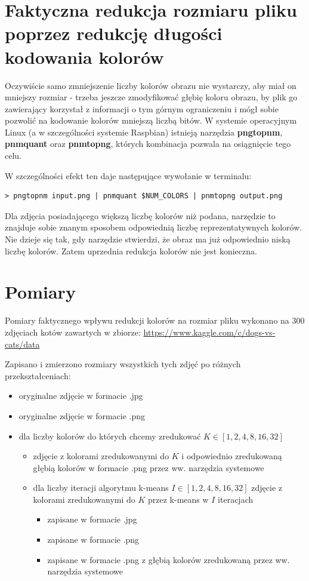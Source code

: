 \section{Faktyczna redukcja rozmiaru pliku poprzez redukcję długości kodowania kolorów}

Oczywiście samo zmniejszenie liczby kolorów obrazu nie wystarczy, aby miał on mniejszy rozmiar - trzeba jeszcze zmodyfikować głębię koloru obrazu, by plik go zawierający korzystał z informacji o tym górnym ograniczeniu i mógł sobie pozwolić na kodowanie kolorów mniejszą liczbą bitów.
W systemie operacyjnym Linux (a w szczególności systemie Raspbian) istnieją narzędzia \textbf{pngtopnm}, \textbf{pnmquant} oraz \textbf{pnmtopng}, których kombinacja pozwala na osiągnięcie tego celu.

W szczególności efekt ten daje następujące wywołanie w terminalu:

\begin{lstlisting}
> pngtopnm input.png | pnmquant $NUM_COLORS | pnmtopng output.png
\end{lstlisting}

Dla zdjęcia posiadającego większą liczbę kolorów niż podana, narzędzie to znajduje sobie znanym sposobem odpowiednią liczbę reprezentatywnych kolorów. Nie dzieje się tak, gdy narzędzie stwierdzi, że obraz ma już odpowiednio niską liczbę kolorów. Zatem uprzednia redukcja kolorów nie jest konieczna.

\section{Pomiary}

Pomiary faktycznego wpływu redukcji kolorów na rozmiar pliku wykonano na 300 zdjęciach kotów zawartych w zbiorze: \url{https://www.kaggle.com/c/dogs-vs-cats/data}

Zapisano i zmierzono rozmiary wszystkich tych zdjęć po różnych przekształceniach:

\begin{itemize}
\item oryginalne zdjęcie w formacie .jpg
\item oryginalne zdjęcie w formacie .png
\item dla liczby kolorów do których chcemy zredukować $K \in [1, 2, 4, 8, 16, 32]$
	\begin{itemize}
      \item zdjęcie z kolorami zredukowanymi do $K$  i odpowiednio zredukowaną głębią kolorów w formacie .png przez ww. narzędzia systemowe
      \item dla liczby iteracji algorytmu k-means $I \in [1, 2, 4, 8, 16, 32]$ zdjęcie z kolorami zredukowanymi do $K$ przez k-means w $I$ iteracjach
      \begin{itemize}
        \item zapisane w formacie .jpg
        \item zapisane w formacie .png
        \item zapisane w formacie .png z głębią kolorów zredukowaną przez ww. narzędzia systemowe
      \end{itemize}
	\end{itemize}
\end{itemize}

